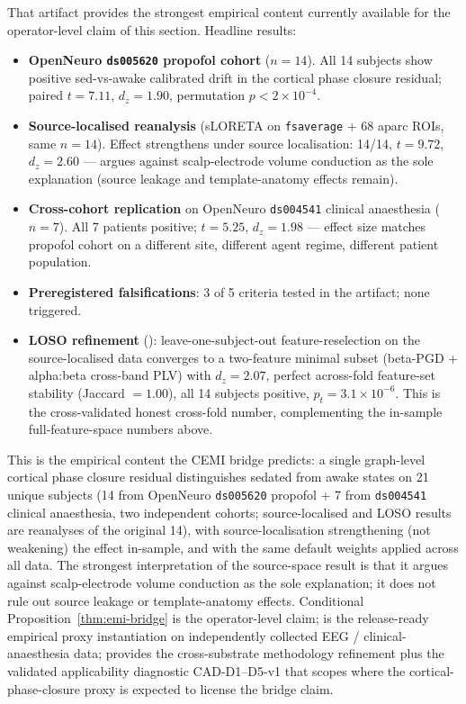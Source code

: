 \documentclass[11pt]{article}
\theoremstyle{plain}
\theoremstyle{definition}
\theoremstyle{remark}
\begin{document}
That artifact provides the strongest empirical content currently available for the operator-level claim of this section. Headline results:

\begin{itemize}[leftmargin=2em]
\item \textbf{OpenNeuro \texttt{ds005620} propofol cohort} ($n = 14$). All 14 subjects show positive sed-vs-awake calibrated drift in the cortical phase closure residual; paired $t = 7.11$, $d_z = 1.90$, permutation $p < 2 \times 10^{-4}$.
\item \textbf{Source-localised reanalysis} (sLORETA on \texttt{fsaverage} + 68 aparc ROIs, same $n = 14$). Effect strengthens under source localisation: 14/14, $t = 9.72$, $d_z = 2.60$ --- argues against scalp-electrode volume conduction as the sole explanation (source leakage and template-anatomy effects remain).
\item \textbf{Cross-cohort replication} on OpenNeuro \texttt{ds004541} clinical anaesthesia ($n = 7$). All 7 patients positive; $t = 5.25$, $d_z = 1.98$ --- effect size matches propofol cohort on a different site, different agent regime, different patient population.
\item \textbf{Preregistered falsifications}: 3 of 5 criteria tested in the artifact; none triggered.
\item \textbf{LOSO refinement} (\citet{SmartClosureDistance}): leave-one-subject-out feature-reselection on the source-localised data converges to a two-feature minimal subset (beta-PGD + alpha:beta cross-band PLV) with $d_z = 2.07$, perfect across-fold feature-set stability (Jaccard $= 1.00$), all 14 subjects positive, $p_t = 3.1 \times 10^{-6}$. This is the cross-validated honest cross-fold number, complementing the in-sample full-feature-space numbers above.
\end{itemize}

This is the empirical content the CEMI bridge predicts: a single graph-level cortical phase closure residual distinguishes sedated from awake states on 21 unique subjects (14 from OpenNeuro \texttt{ds005620} propofol + 7 from \texttt{ds004541} clinical anaesthesia, two independent cohorts; source-localised and LOSO results are reanalyses of the original 14), with source-localisation strengthening (not weakening) the effect in-sample, and with the same default weights applied across all data. The strongest interpretation of the source-space result is that it argues against scalp-electrode volume conduction as the sole explanation; it does not rule out source leakage or template-anatomy effects. Conditional Proposition~\ref{thm:emi-bridge} is the operator-level claim; \citet{SolutionLab002} is the release-ready empirical proxy instantiation on independently collected EEG / clinical-anaesthesia data; \citet{SmartClosureDistance} provides the cross-substrate methodology refinement plus the validated applicability diagnostic CAD-D1--D5-v1 that scopes where the cortical-phase-closure proxy is expected to license the bridge claim.
\end{document}
